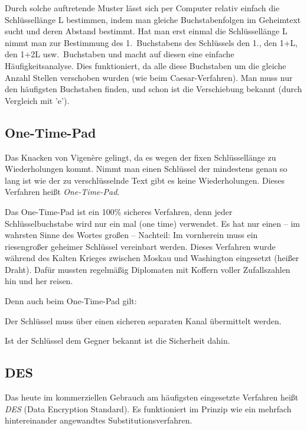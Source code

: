 Durch solche auftretende Muster lässt sich per Computer relativ einfach die
Schlüssellänge L bestimmen, indem man gleiche Buchstabenfolgen im Geheimtext
sucht und deren Abstand bestimmt. Hat man erst einmal die Schlüssellänge L
nimmt man zur Bestimmung des 1.~Buchstabens des Schlüssels den 1., den 1+L, den
1+2L usw.\ Buchstaben und macht auf diesen eine einfache Häufigkeitsanalyse.
Dies funktioniert, da alle diese Buchstaben um die gleiche Anzahl Stellen
verschoben wurden (wie beim Caesar-Verfahren). Man muss nur den häufigsten
Buchstaben finden, und schon ist die Verschiebung bekannt (durch Vergleich mit
'e').

\subsection{One-Time-Pad}

Das Knacken von Vigenère gelingt, da es wegen der fixen Schlüssellänge zu
Wiederholungen kommt. Nimmt man einen Schlüssel der mindestens genau so lang ist
wie der zu verschlüsselnde Text gibt es keine Wiederholungen. Dieses Verfahren
heißt \emph{One-Time-Pad}.

Das One-Time-Pad ist ein 100\% sicheres Verfahren, denn jeder Schlüsselbuchstabe
wird nur ein mal (one time) verwendet. Es hat nur einen -- im wahrsten Sinne des
Wortes großen -- Nachteil: Im vornherein muss ein riesengroßer geheimer
Schlüssel vereinbart werden. Dieses Verfahren wurde während des Kalten Krieges
zwischen Moskau und Washington eingesetzt (\glqq heißer Draht\grqq ). Dafür
mussten regelmäßig Diplomaten mit Koffern voller Zufallszahlen hin und
her reisen.

Denn auch beim One-Time-Pad gilt:

\begin{compactitem}
\item Der Schlüssel muss über einen sicheren separaten Kanal übermittelt werden.
\item Ist der Schlüssel dem Gegner bekannt ist die Sicherheit dahin.
\end{compactitem}

\subsection{DES}

Das heute im kommerziellen Gebrauch am häufigsten eingesetzte Verfahren heißt
\emph{DES} (\glqq Data Encryption Standard\grqq ). Es funktioniert im Prinzip
wie ein mehrfach hintereinander angewandtes Substitutionsverfahren.

